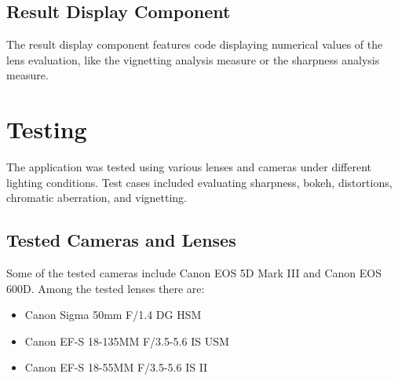 \subsection{Result Display Component}
The result display component features code displaying numerical values of the lens evaluation, like the vignetting analysis measure or the sharpness analysis measure.

\section{Testing}
The application was tested using various lenses and cameras under different lighting conditions. Test cases included evaluating sharpness, bokeh, distortions, chromatic aberration, and vignetting.
\subsection{Tested Cameras and Lenses}
Some of the tested cameras include Canon EOS 5D Mark III and Canon EOS 600D.
Among the tested lenses there are:

\begin{itemize}
    \item Canon Sigma 50mm F/1.4 DG HSM
    \item Canon EF-S 18-135MM F/3.5-5.6 IS USM
    \item Canon EF-S 18-55MM F/3.5-5.6 IS II
\end{itemize}
